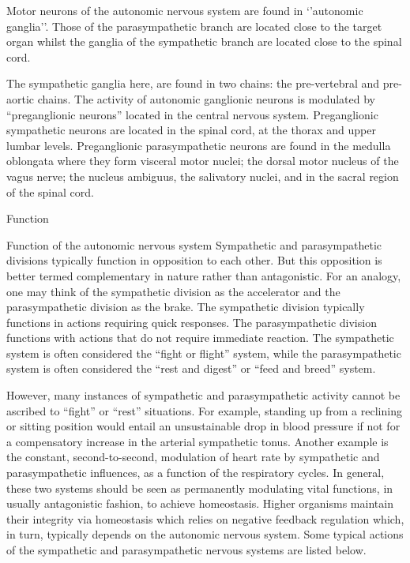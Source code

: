 \documentclass[]{book}
\begin{document}
Motor neurons of the autonomic nervous system are found in `'autonomic ganglia''. Those of the parasympathetic branch are located close to the target organ whilst the ganglia of the sympathetic branch are located close to the spinal cord.

The sympathetic ganglia here, are found in two chains: the pre-vertebral and pre-aortic chains. The activity of autonomic ganglionic neurons is modulated by ``preganglionic neurons'' located in the central nervous system. Preganglionic sympathetic neurons are located in the spinal cord, at the thorax and upper lumbar levels. Preganglionic parasympathetic neurons are found in the medulla oblongata where they form visceral motor nuclei; the dorsal motor nucleus of the vagus nerve; the nucleus ambiguus, the salivatory nuclei, and in the sacral region of the spinal cord.

Function

Function of the autonomic nervous system
Sympathetic and parasympathetic divisions typically function in opposition to each other. But this opposition is better termed complementary in nature rather than antagonistic. For an analogy, one may think of the sympathetic division as the accelerator and the parasympathetic division as the brake. The sympathetic division typically functions in actions requiring quick responses. The parasympathetic division functions with actions that do not require immediate reaction. The sympathetic system is often considered the ``fight or flight'' system, while the parasympathetic system is often considered the ``rest and digest'' or ``feed and breed'' system.

However, many instances of sympathetic and parasympathetic activity cannot be ascribed to ``fight'' or ``rest'' situations. For example, standing up from a reclining or sitting position would entail an unsustainable drop in blood pressure if not for a compensatory increase in the arterial sympathetic tonus. Another example is the constant, second-to-second, modulation of heart rate by sympathetic and parasympathetic influences, as a function of the respiratory cycles. In general, these two systems should be seen as permanently modulating vital functions, in usually antagonistic fashion, to achieve homeostasis. Higher organisms maintain their integrity via homeostasis which relies on negative feedback regulation which, in turn, typically depends on the autonomic nervous system. Some typical actions of the sympathetic and parasympathetic nervous systems are listed below.
\end{document}
